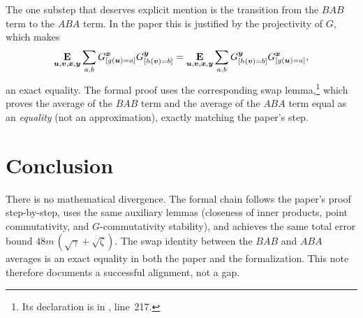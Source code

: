 \documentclass{article}
\newcommand{\ABA}{\textit{ABA}}
\newcommand{\BAB}{\textit{BAB}}
\begin{document}
The one substep that deserves explicit mention is the transition
from the $\BAB$ term to the $\ABA$ term. In the paper this is
justified by the projectivity of $G$, which makes
\[
  \mathop{\bf E\/}_{\boldsymbol{u},\boldsymbol{v},{\boldsymbol{x}},\boldsymbol{y}} \sum_{a,b} G^{{\boldsymbol{x}}}_{[g(\boldsymbol{u})=a]}
  G^{\boldsymbol{y}}_{[h(\boldsymbol{v})=b]}
  = 
  \mathop{\bf E\/}_{\boldsymbol{u},\boldsymbol{v},{\boldsymbol{x}},\boldsymbol{y}} \sum_{a,b} G^{\boldsymbol{y}}_{[h(\boldsymbol{v})=b]}
  G^{{\boldsymbol{x}}}_{[g(\boldsymbol{u})=a]},
\]
an exact equality. The formal proof uses the corresponding swap
lemma,\footnote{Its declaration is
 in
,
line~217.}
which proves the average of the $\BAB$ term and the average of the
$\ABA$ term equal as an \emph{equality} (not an approximation),
exactly matching the paper's step.

\section{Conclusion}

There is no mathematical divergence. The formal chain follows the
paper's proof step-by-step, uses the same auxiliary lemmas (closeness
of inner products, point commutativity, and $G$-commutativity
stability), and achieves the same total error bound
$48m\,(\sqrt{\gamma}+\sqrt{\zeta})$. The swap identity between the
$\BAB$ and $\ABA$ averages is an exact equality in both the paper
and the formalization. This note therefore documents a successful
alignment, not a gap.



\end{document}
